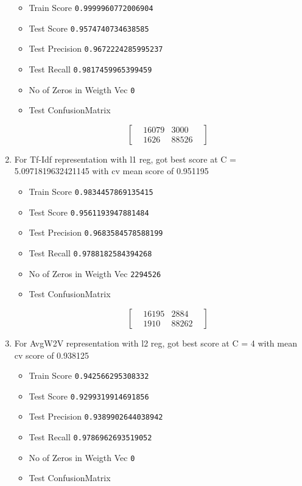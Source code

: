 \documentclass[11pt]{article}
\providecommand{\tightlist}{%
      \setlength{\itemsep}{0pt}\setlength{\parskip}{0pt}}
\begin{document}
\begin{enumerate}
  \begin{itemize}
  \tightlist
  \item
    Train Score \texttt{0.9999960772006904}
  \item
    Test Score \texttt{0.9574740734638585}
  \item
    Test Precision \texttt{0.9672224285995237}
  \item
    Test Recall \texttt{0.9817459965399459}
  \item
    No of Zeros in Weigth Vec \texttt{0}
  \item
    Test ConfusionMatrix

    \begin{equation}
    \begin{bmatrix}
    & 16079 & 3000 &  \\
    & 1626 & 88526 & 
    \end{bmatrix}
    \end{equation}
  \end{itemize}
\item
  For Tf-Idf representation with l1 reg, got best score at C =
  5.0971819632421145 with cv mean score of 0.951195

  \begin{itemize}
  \tightlist
  \item
    Train Score \texttt{0.9834457869135415}
  \item
    Test Score \texttt{0.9561193947881484}
  \item
    Test Precision \texttt{0.9683584578588199}
  \item
    Test Recall \texttt{0.9788182584394268}
  \item
    No of Zeros in Weigth Vec \texttt{2294526}
  \item
    Test ConfusionMatrix

    \begin{equation}
    \begin{bmatrix}
    & 16195 & 2884 &  \\
    & 1910 & 88262 & 
    \end{bmatrix}
    \end{equation}
  \end{itemize}
\item
  For AvgW2V representation with l2 reg, got best score at C = 4 with
  mean cv score of 0.938125

  \begin{itemize}
  \tightlist
  \item
    Train Score \texttt{0.942566295308332}
  \item
    Test Score \texttt{0.9299319914691856}
  \item
    Test Precision \texttt{0.9389902644038942}
  \item
    Test Recall \texttt{0.9786962693519052}
  \item
    No of Zeros in Weigth Vec \texttt{0}
  \item
    Test ConfusionMatrix


\end{itemize}
\end{enumerate}
\end{document}
